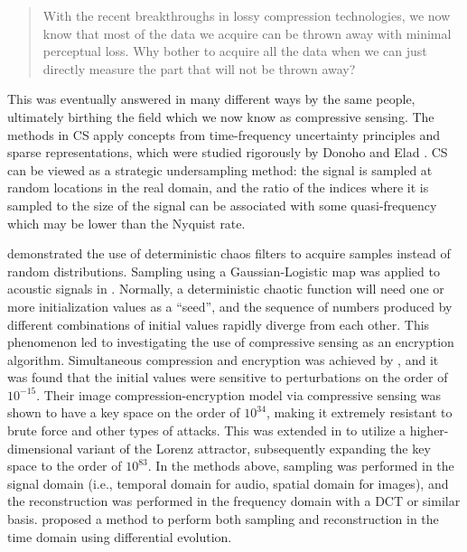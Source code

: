 \begin{quote}
	With the recent breakthroughs in lossy compression technologies, we now know that most of the data we acquire can be thrown away with minimal perceptual loss. Why bother to acquire all the data when we can just directly measure the part that will not be thrown away?
\end{quote}

\noindent This was eventually answered in many different ways by the same people, ultimately birthing the field which we now know as compressive sensing. The methods in CS apply concepts from time-frequency uncertainty principles \cite{Donoho2001} and sparse representations, which were studied rigorously by Donoho and Elad \cite{Donoho2003}. CS can be viewed as a strategic undersampling method: the signal is sampled at random locations in the real domain, and the ratio of the indices where it is sampled to the size of the signal can be associated with some quasi-frequency which may be lower than the Nyquist rate.

\cite{LinhTrung2008} demonstrated the use of deterministic chaos filters to acquire samples instead of random distributions. Sampling using a Gaussian-Logistic map was applied to acoustic signals in \cite{Mathew2016}. Normally, a deterministic chaotic function will need one or more initialization values as a ``seed'', and the sequence of numbers produced by different combinations of initial values rapidly diverge from each other. This phenomenon led to investigating the use of compressive sensing as an encryption algorithm. Simultaneous compression and encryption was achieved by \cite{Mo2013}, and it was found that the initial values were sensitive to perturbations on the order of $10^{-15}$. Their image compression-encryption model via compressive sensing was shown to have a key space on the order of $10^{34}$, making it extremely resistant to brute force and other types of attacks. This was extended in \cite{Zhou2016} to utilize a higher-dimensional variant of the Lorenz attractor, subsequently expanding the key space to the order of $10^{83}$. In the methods above, sampling was performed in the signal domain (i.e., temporal domain for audio, spatial domain for images), and the reconstruction was performed in the frequency domain with a DCT or similar basis. \cite{Andras2018} proposed a method to perform both sampling and reconstruction in the time domain using differential evolution.

